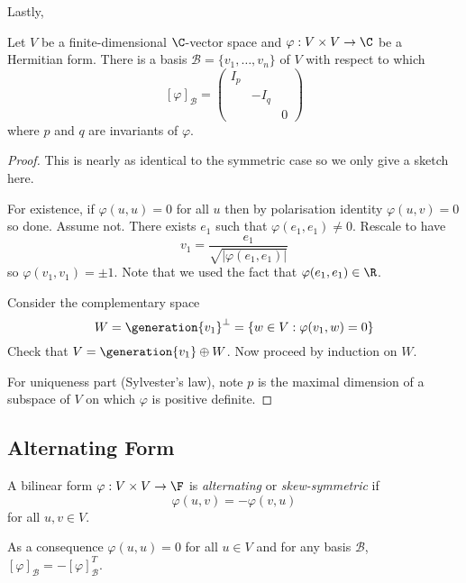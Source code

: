 \documentclass[a4paper]{article}
\newcommand*{\spans}{\generation}
\newcommand*{\basis}{\mathcal}
\theoremstyle{definition}
\begin{document}
Lastly,
\begin{theorem}
  Let \(V\) be a finite-dimensional \(\C\)-vector space and \(\varphi: V \times V \to \C\) be a Hermitian form. There is a basis \(\basis B = \{v_1, \dots, v_n\}\) of \(V\) with respect to which
  \[
    [\varphi]_{\basis B} =
    \begin{pmatrix}
      I_p & & \\
      & -I_q & \\
      & & 0
    \end{pmatrix}
  \]
  where \(p\) and \(q\) are invariants of \(\varphi\).
\end{theorem}

\begin{proof}
  This is nearly as identical to the symmetric case so we only give a sketch here.

  For existence, if \(\varphi(u, u) = 0\) for all \(u\) then by polarisation identity \(\varphi(u, v) = 0\) so done. Assume not. There exists \(e_1\) such that \(\varphi(e_1, e_1) \neq 0\). Rescale to have
  \[
    v_1 = \frac{e_1}{\sqrt{|\varphi(e_1, e_1)|}}
  \]
  so \(\varphi(v_1, v_1) = \pm 1\). Note that we used the fact that \(\varphi(e_1, e_1) \in \R\).

  Consider the complementary space
  \[
    W = \spans{v_1}^\perp = \left\{ w \in V: \varphi(v_1, w) = 0 \right\}
  \]
  Check that \(V = \spans{v_1} \oplus W\). Now proceed by induction on \(W\).

  For uniqueness part (Sylvester's law), note \(p\) is the maximal dimension of a subspace of \(V\) on which \(\varphi\) is positive definite.
\end{proof}

\subsection{Alternating Form}

\begin{definition}
  A bilinear form \(\varphi: V \times V \to \F\) is \emph{alternating} or \emph{skew-symmetric} if
  \[
    \varphi(u, v) = - \varphi(v, u)
  \]
  for all \(u, v \in V\).
\end{definition}

As a consequence \(\varphi(u, u) = 0\) for all \(u \in V\) and for any basis \(\basis B\), \([\varphi]_{\basis B} = - [\varphi]_{\basis B}^T\).
\end{document}

